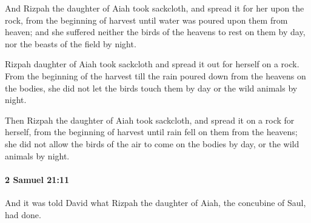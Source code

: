 			\begin{versebox}
					\item[BHS] 
					\item[ASV] And Rizpah the daughter of Aiah took sackcloth, and spread it for her upon the rock, from the beginning of harvest until water was poured upon them from heaven; and she suffered neither the birds of the heavens to rest on them by day, nor the beasts of the field by night.
					\item[NIV] Rizpah daughter of Aiah took sackcloth and spread it out for herself on a rock. From the beginning of the harvest till the rain poured down from the heavens on the bodies, she did not let the birds touch them by day or the wild animals by night.
					\item[NRSV] Then Rizpah the daughter of Aiah took sackcloth, and spread it on a rock for herself, from the beginning of harvest until rain fell on them from the heavens; she did not allow the birds of the air to come on the bodies by day, or the wild animals by night.
			\end{versebox}

		\paragraph{2 Samuel 21:11} %
			\label{2SAMUEL-21-11}

			And it was told David what Rizpah the daughter of Aiah, the concubine of Saul, had done.

